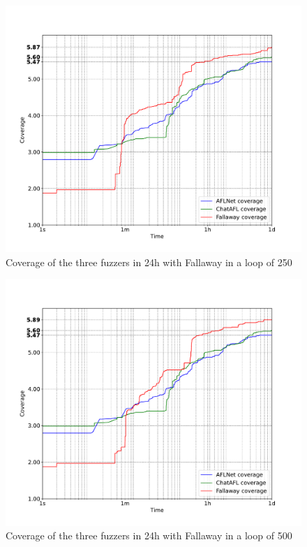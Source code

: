 \begin{figure}[H]
    \centering
    \includegraphics[width=1\textwidth]{Images/coverage_over_time_lighttpd-1day-250l.pdf}
    \caption{Coverage of the three fuzzers in 24h with Fallaway in a loop of 250}
    \label{fig:coverage_10hours}
\end{figure}

\begin{figure}[H]
    \centering
    \includegraphics[width=1\textwidth]{Images/coverage_over_time_lighttpd-1day-500l.pdf}
    \caption{Coverage of the three fuzzers in 24h with Fallaway in a loop of 500}
    \label{fig:coverage_10hours}
\end{figure}


